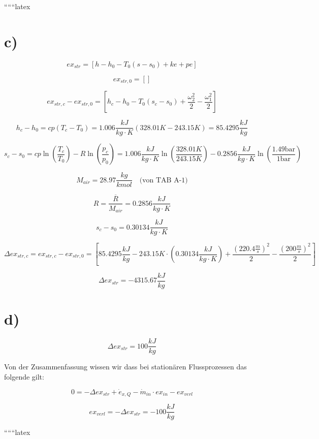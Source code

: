 ``````latex


\section*{c)}

\[
ex_{str} = \left[ h - h_0 - T_0 (s - s_0) + ke + pe \right]
\]

\[
ex_{str,0} = \left[ \right]
\]

\[
ex_{str,c} - ex_{str,0} = \left[ h_c - h_0 - T_0 (s_c - s_0) + \frac{\omega_2^2}{2} - \frac{\omega_1^2}{2} \right]
\]

\[
h_c - h_0 = cp \left( T_c - T_0 \right) = 1.006 \frac{kJ}{kg \cdot K} \left( 328.01K - 243.15K \right) = 85.4295 \frac{kJ}{kg}
\]

\[
s_c - s_0 = cp \ln \left( \frac{T_c}{T_0} \right) - R \ln \left( \frac{p_c}{p_0} \right) = 1.006 \frac{kJ}{kg \cdot K} \ln \left( \frac{328.01K}{243.15K} \right) - 0.2856 \frac{kJ}{kg \cdot K} \ln \left( \frac{1.49 \text{bar}}{1 \text{bar}} \right)
\]

\[
M_{air} = 28.97 \frac{kg}{kmol} \quad \text{(von TAB A-1)}
\]

\[
R = \frac{\overline{R}}{M_{air}} = 0.2856 \frac{kJ}{kg \cdot K}
\]

\[
s_c - s_0 = 0.30134 \frac{kJ}{kg \cdot K}
\]

\[
\Delta ex_{str,c} = ex_{str,c} - ex_{str,0} = \left[ 85.4295 \frac{kJ}{kg} - 243.15K \cdot (0.30134 \frac{kJ}{kg \cdot K}) + \frac{(220.4 \frac{m}{s})^2}{2} - \frac{(200 \frac{m}{s})^2}{2} \right]
\]

\[
\Delta ex_{str} = -4315.67 \frac{kJ}{kg}
\]

\section*{d)}

\[
\Delta ex_{str} = 100 \frac{kJ}{kg}
\]

Von der Zusammenfassung wissen wir dass bei stationären Flussprozessen das folgende gilt:

\[
0 = -\Delta ex_{str} + \dot{e}_{x,Q} - \dot{m}_{in} \cdot ex_{in} - ex_{verl}
\]

\[
ex_{verl} = -\Delta ex_{str} = -100 \frac{kJ}{kg}
\]

``````latex


